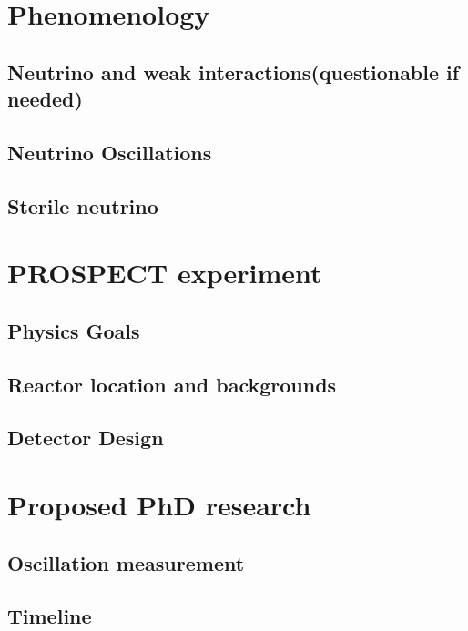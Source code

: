 \documentclass[11pt]{article}
\begin{document}
\section{Phenomenology}

\subsection{Neutrino and weak interactions(questionable if needed)}

\subsection{Neutrino Oscillations}

\subsection{Sterile neutrino }

\section{PROSPECT experiment}

\cite{2013arXiv1309.7647A}

\subsection{Physics Goals}

\subsection{Reactor location and backgrounds}

\subsection{Detector Design}

\section{Proposed PhD research}

\subsection{Oscillation measurement}

\subsection{Timeline}
\end{document}
